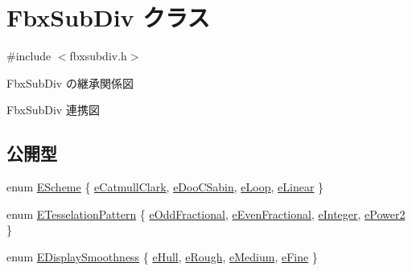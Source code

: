 \hypertarget{class_fbx_sub_div}{}\section{Fbx\+Sub\+Div クラス}
\label{class_fbx_sub_div}


{\ttfamily \#include $<$fbxsubdiv.\+h$>$}



Fbx\+Sub\+Div の継承関係図


Fbx\+Sub\+Div 連携図
\subsection*{公開型}
\begin{DoxyCompactItemize}
\item 
enum \hyperlink{class_fbx_sub_div_aecdd4fdebb20f2796363989eba8ee9f5}{E\+Scheme} \{ \hyperlink{class_fbx_sub_div_aecdd4fdebb20f2796363989eba8ee9f5a704e0c326608197ed346cae170291408}{e\+Catmull\+Clark}, 
\hyperlink{class_fbx_sub_div_aecdd4fdebb20f2796363989eba8ee9f5ae0cd97d1b6d46dd85afd41b94390e6f5}{e\+Doo\+C\+Sabin}, 
\hyperlink{class_fbx_sub_div_aecdd4fdebb20f2796363989eba8ee9f5a443dd57dbee4fe52d99159b9c2f7e75e}{e\+Loop}, 
\hyperlink{class_fbx_sub_div_aecdd4fdebb20f2796363989eba8ee9f5a8e4c8b011a7f345938db4632efa7982d}{e\+Linear}
 \}
\item 
enum \hyperlink{class_fbx_sub_div_a06cb3da0d9b384dc83585caa49f46684}{E\+Tesselation\+Pattern} \{ \hyperlink{class_fbx_sub_div_a06cb3da0d9b384dc83585caa49f46684a5792590f1ca7fe621e053483e37f867a}{e\+Odd\+Fractional}, 
\hyperlink{class_fbx_sub_div_a06cb3da0d9b384dc83585caa49f46684a79214038fb9a4f90ee767e71d1e5c2e6}{e\+Even\+Fractional}, 
\hyperlink{class_fbx_sub_div_a06cb3da0d9b384dc83585caa49f46684ac00baef4ff2ba07f9d0c3cd85ab279ea}{e\+Integer}, 
\hyperlink{class_fbx_sub_div_a06cb3da0d9b384dc83585caa49f46684a9f9be689f1d831d329f4ea19d672ac63}{e\+Power2}
 \}
\item 
enum \hyperlink{class_fbx_sub_div_a7583b5d09f0eef70bad4563dffbb7e4d}{E\+Display\+Smoothness} \{ \hyperlink{class_fbx_sub_div_a7583b5d09f0eef70bad4563dffbb7e4da418bd962df378a8f4f6bb374c511e0fd}{e\+Hull}, 
\hyperlink{class_fbx_sub_div_a7583b5d09f0eef70bad4563dffbb7e4da39e8da77178a3448663bccbccbc023ee}{e\+Rough}, 
\hyperlink{class_fbx_sub_div_a7583b5d09f0eef70bad4563dffbb7e4da74f694846f926ab58e8c4fe723d59fb9}{e\+Medium}, 
\hyperlink{class_fbx_sub_div_a7583b5d09f0eef70bad4563dffbb7e4da35961a7ce1bc203cbea01010b5b38625}{e\+Fine}
 \}
\end{DoxyCompactItemize}
